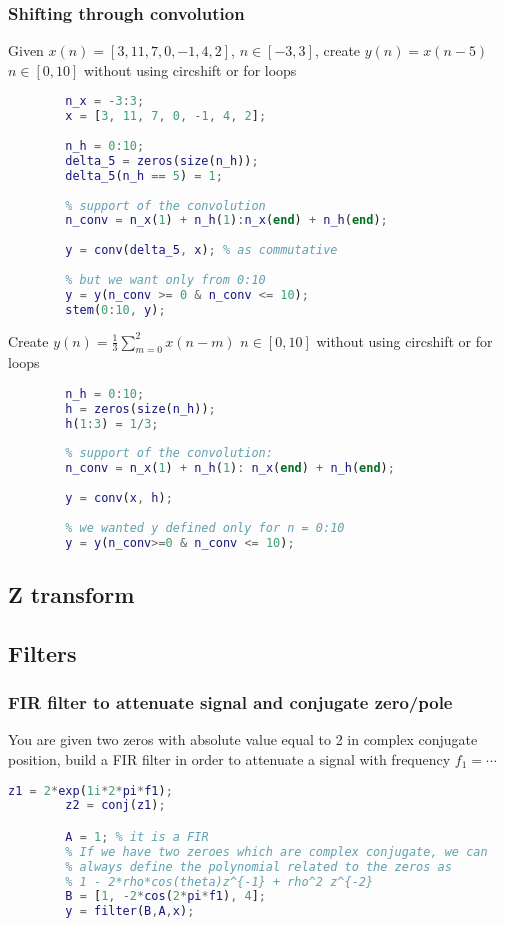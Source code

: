    \subsubsection{Shifting through convolution}
    Given $x(n)=[3,11,7,0,-1,4,2]$, $n\in[-3,3]$, create $y(n)=x(n-5)$ $n\in[0,10]$ without using circshift or for loops
    \begin{lstlisting}[language=Matlab, escapeinside=`']
        % y(n)=x(n-5)=x(n)*\delta(n-5)
        n_x = -3:3;
        x = [3, 11, 7, 0, -1, 4, 2];
        
        n_h = 0:10;
        delta_5 = zeros(size(n_h));
        delta_5(n_h == 5) = 1;
        
        % support of the convolution
        n_conv = n_x(1) + n_h(1):n_x(end) + n_h(end);
        
        y = conv(delta_5, x); % as commutative
        
        % but we want only from 0:10
        y = y(n_conv >= 0 & n_conv <= 10);
        stem(0:10, y);
    \end{lstlisting}
    Create $y(n)=\frac{1}{3}\sum_{m=0}^2x(n-m)$ $n\in[0,10]$ without using circshift or for loops
    \begin{lstlisting}[language=Matlab, escapeinside=`']
        % define the filter, which is 1/3 (delta(n) + delta(n-1) + delta(n-2))
        n_h = 0:10;
        h = zeros(size(n_h));
        h(1:3) = 1/3;
        
        % support of the convolution:
        n_conv = n_x(1) + n_h(1): n_x(end) + n_h(end);
        
        y = conv(x, h);
        
        % we wanted y defined only for n = 0:10 
        y = y(n_conv>=0 & n_conv <= 10);
    \end{lstlisting}

\subsection{Z transform}

\subsection{Filters}

    \subsubsection{FIR filter to attenuate signal and conjugate zero/pole}
    You are given two zeros with absolute value equal to 2 in complex conjugate position, build a FIR filter in order to attenuate a signal with frequency $f_1=\cdots$
    \begin{lstlisting}[language=Matlab, escapeinside=`']
        z1 = 2*exp(1i*2*pi*f1);
        z2 = conj(z1);

        A = 1; % it is a FIR
        % If we have two zeroes which are complex conjugate, we can
        % always define the polynomial related to the zeros as
        % 1 - 2*rho*cos(theta)z^{-1} + rho^2 z^{-2}
        B = [1, -2*cos(2*pi*f1), 4];
        y = filter(B,A,x);
    \end{lstlisting}

